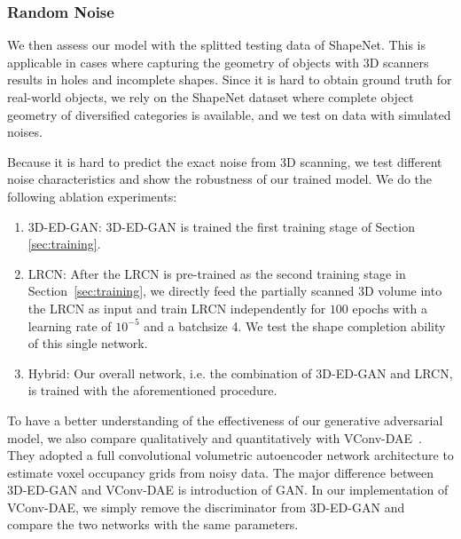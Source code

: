 \documentclass[10pt,twocolumn,letterpaper]{article}
\begin{document}
\subsubsection{Random Noise}
\label{sec:randomnoise}
We then assess our model with the splitted testing data of ShapeNet. This is applicable in cases where capturing the geometry of objects with 3D scanners results in holes and incomplete shapes. Since it is hard to obtain ground truth for real-world objects, we rely on the ShapeNet dataset where complete object geometry of diversified categories is available, and we test on data with simulated noises. %

Because it is hard to predict the exact noise from 3D scanning, we test different noise characteristics and show the robustness of our trained model. We do the following ablation experiments:
\begin{enumerate}
\item 3D-ED-GAN: 3D-ED-GAN is trained the first training stage of Section \ref{sec:training}.
\item LRCN: After the LRCN is pre-trained as the second training stage in Section~\ref{sec:training}, we directly feed the partially scanned 3D volume into the LRCN as input and train LRCN independently for $100$ epochs with a learning rate of $10^{-5}$ and a batchsize 4. We test the shape completion ability of this single network.
\item Hybrid: Our overall network, i.e. the combination of 3D-ED-GAN and LRCN, is trained with the aforementioned procedure.
\end{enumerate} 

To have a better understanding of the effectiveness of our generative adversarial model, we also compare qualitatively and quantitatively with VConv-DAE~\cite{vconvdae}. They adopted a full convolutional volumetric autoencoder network architecture to estimate voxel occupancy grids from noisy data. The major difference between 3D-ED-GAN and VConv-DAE is introduction of GAN. In our implementation of VConv-DAE, we simply remove the discriminator from 3D-ED-GAN and compare the two networks with the same parameters.%
\end{document}
